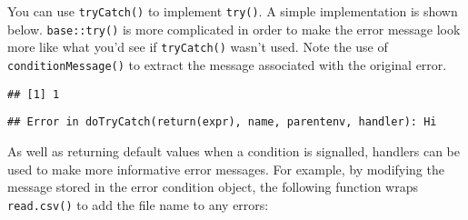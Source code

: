 You can use \texttt{tryCatch()} to implement \texttt{try()}. A simple
implementation is shown below. \texttt{base::try()} is more complicated
in order to make the error message look more like what you'd see if
\texttt{tryCatch()} wasn't used. Note the use of
\texttt{conditionMessage()} to extract the message associated with the
original error.

\begin{Shaded}
\begin{Highlighting}[]
\StringTok{ } \NormalTok{) \{}
   
\StringTok{ }
    \NormalTok{ (}\OperatorTok{!}
    \NormalTok{(} \NormalTok{))}
\NormalTok{  \})}
\NormalTok{\}}

\NormalTok{(}\NormalTok{)}
\end{Highlighting}
\end{Shaded}

\begin{verbatim}
## [1] 1
\end{verbatim}

\begin{Shaded}
\begin{Highlighting}[]
\NormalTok{(}\NormalTok{(}\NormalTok{))}
\end{Highlighting}
\end{Shaded}

\begin{verbatim}
## Error in doTryCatch(return(expr), name, parentenv, handler): Hi
\end{verbatim}

\begin{Shaded}
\begin{Highlighting}[]
\NormalTok{(}\NormalTok{(}\NormalTok{), } \NormalTok{)}
\end{Highlighting}
\end{Shaded}

As well as returning default values when a condition is signalled,
handlers can be used to make more informative error messages. For
example, by modifying the message stored in the error condition object,
the following function wraps \texttt{read.csv()} to add the file name to
any errors:

